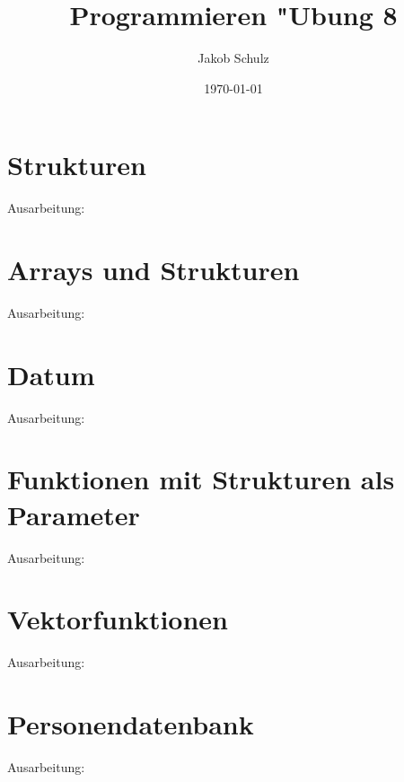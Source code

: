 \documentclass[a4paper,11pt,titlepage]{article}
\begin{document}
\title{Programmieren "Ubung 8}


\author{Jakob Schulz}


\date{\today}

\maketitle{\thispagestyle{plain}}

\section{Strukturen}
Ausarbeitung:
\newpage
\section{Arrays und Strukturen}
Ausarbeitung:
\newpage
\section{Datum}
Ausarbeitung:
\newpage
\section{Funktionen mit Strukturen als Parameter}
Ausarbeitung:
\newpage
\section{Vektorfunktionen}
Ausarbeitung:
\newpage
\section{Personendatenbank}
Ausarbeitung:
\newpage
\end{document}
